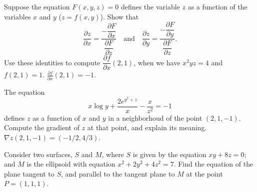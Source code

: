 
{Suppose the equation $F(x,y,z)=0$ defines the variable $z$ as a function of the variables $x$ and $y$ ($z=f(x,y)$).
Show that
\[
\frac{\partial z}{\partial x} = \frac{-\dfrac{\partial F}{\partial x}}{\dfrac{\partial F}{\partial z}}
\quad \mbox{and} \quad
\frac{\partial z}{\partial y} = \frac{-\dfrac{\partial F}{\partial y}}{\dfrac{\partial F}{\partial z}}.
\]
Use these identities to compute $\dfrac{\partial f}{\partial x}(2,1)$, when we have $x^2yz=4$ and $f(2,1)=1$.
}
{$\frac{\partial f}{\partial x}(2,1)=-1.$
}
{
}

{The equation
\[
x\log y+\frac{2e^{y^2+z}}{x}-\frac{x}{z^2} = -1
\]
defines $z$ as a function of $x$ and $y$ in a neighborhoud of the point $(2,1,-1)$.
Compute the gradient of $z$ at that point, and explain its meaning.
}
{$\nabla z(2,1,-1) = (-1/2,4/3)$.
}
{
}


{Consider two surfaces, $S$ and $M$, where $S$ is given by the equation $xy+8z=0$; and $M$ is the ellipsoid with equation $x^2+2y^2+4z^2=7$.
Find the equation of the plane tangent to $S$, and parallel to the tangent plane to $M$ at the point $P=(1,1,1)$.
}
{
}
{
}
